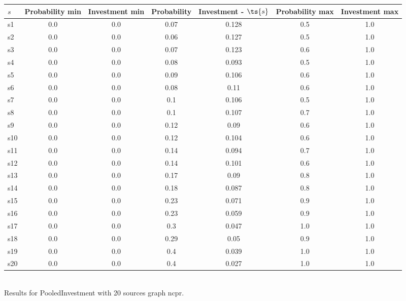 \documentclass{article}
\begin{document}
\noindent\begin{tabular}{|l|c|c|c|c|c|c|}
\hline
$s$& Probability min & Investment min & Probability & Investment - $\ts{s}$ & Probability max & Investment max\\
\hline
s1 &0.0 & 0.0 & 0.07 & 0.128 & 0.5 & 1.0\\
\hline
s2 &0.0 & 0.0 & 0.06 & 0.127 & 0.5 & 1.0\\
\hline
s3 &0.0 & 0.0 & 0.07 & 0.123 & 0.6 & 1.0\\
\hline
s4 &0.0 & 0.0 & 0.08 & 0.093 & 0.5 & 1.0\\
\hline
s5 &0.0 & 0.0 & 0.09 & 0.106 & 0.6 & 1.0\\
\hline
s6 &0.0 & 0.0 & 0.08 & 0.11 & 0.6 & 1.0\\
\hline
s7 &0.0 & 0.0 & 0.1 & 0.106 & 0.5 & 1.0\\
\hline
s8 &0.0 & 0.0 & 0.1 & 0.107 & 0.7 & 1.0\\
\hline
s9 &0.0 & 0.0 & 0.12 & 0.09 & 0.6 & 1.0\\
\hline
s10 &0.0 & 0.0 & 0.12 & 0.104 & 0.6 & 1.0\\
\hline
s11 &0.0 & 0.0 & 0.14 & 0.094 & 0.7 & 1.0\\
\hline
s12 &0.0 & 0.0 & 0.14 & 0.101 & 0.6 & 1.0\\
\hline
s13 &0.0 & 0.0 & 0.17 & 0.09 & 0.8 & 1.0\\
\hline
s14 &0.0 & 0.0 & 0.18 & 0.087 & 0.8 & 1.0\\
\hline
s15 &0.0 & 0.0 & 0.23 & 0.071 & 0.9 & 1.0\\
\hline
s16 &0.0 & 0.0 & 0.23 & 0.059 & 0.9 & 1.0\\
\hline
s17 &0.0 & 0.0 & 0.3 & 0.047 & 1.0 & 1.0\\
\hline
s18 &0.0 & 0.0 & 0.29 & 0.05 & 0.9 & 1.0\\
\hline
s19 &0.0 & 0.0 & 0.4 & 0.039 & 1.0 & 1.0\\
\hline
s20 &0.0 & 0.0 & 0.4 & 0.027 & 1.0 & 1.0\\
\hline
\end{tabular}\\

\noindent Results for PooledInvestment with 20 sources graph ncpr.
\end{document}
